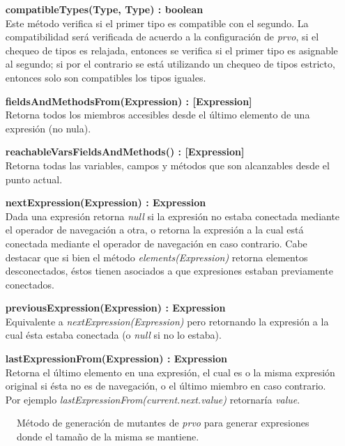 \begin{enumerate}[leftmargin=.75cm,align=left]
	\item[\textbf{compatibleTypes(Type, Type) : boolean}]\mbox{}\\ Este m\'etodo verifica si el primer tipo es compatible con el segundo. La compatibilidad ser\'a verificada de acuerdo a la configuraci\'on de \emph{prvo}, si el chequeo de tipos es relajada, entonces se verifica si el primer tipo es asignable al segundo; si por el contrario se est\'a utilizando un chequeo de tipos estricto, entonces solo son compatibles los tipos iguales.
	
	\item[\textbf{fieldsAndMethodsFrom(Expression) : [Expression]}]\mbox{}\\ Retorna todos los miembros accesibles desde el \'ultimo elemento de una expresi\'on (no nula).
	
	\item[\textbf{reachableVarsFieldsAndMethods() : [Expression]}]\mbox{}\\ Retorna todas las variables, campos y m\'etodos que son alcanzables desde el punto actual.
	
	\item[\textbf{nextExpression(Expression) : Expression}]\mbox{}\\ Dada una expresi\'on retorna \emph{null} si la expresi\'on no estaba conectada mediante el operador de navegaci\'on a otra, o retorna la expresi\'on a la cual est\'a conectada mediante el operador de navegaci\'on en caso contrario. Cabe destacar que si bien el m\'etodo \emph{elements(Expression)} retorna elementos desconectados, \'estos tienen asociados a que expresiones estaban previamente conectados.
	
	\item[\textbf{previousExpression(Expression) : Expression}]\mbox{}\\ Equivalente a \emph{nextExpression(Expression)} pero retornando la expresi\'on a la cual \'esta estaba conectada (o \emph{null} si no lo estaba).
	
	\item[\textbf{lastExpressionFrom(Expression) : Expression}]\mbox{}\\ Retorna el \'ultimo elemento en una expresi\'on, el cual es o la misma expresi\'on original si \'esta no es de navegaci\'on, o el \'ultimo miembro en caso contrario. Por ejemplo \emph{lastExpressionFrom(current.next.value)} retornar\'ia \emph{value}.
\end{enumerate}

\begin{figure}
	
	\caption{M\'etodo de generaci\'on de mutantes de \emph{prvo} para generar expresiones donde el tama\~no de la misma se mantiene.}
	\label{figures.code.prvoMethods.sameLength}
\end{figure}


